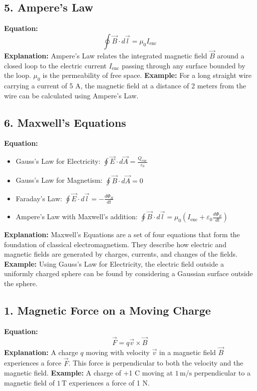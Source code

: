 \documentclass{article}
\begin{document}
\subsection*{5. Ampere's Law}
\textbf{Equation:} 
\[ \oint \vec{B} \cdot d\vec{l} = \mu_0 I_{\text{enc}} \]
\textbf{Explanation:} 
Ampere's Law relates the integrated magnetic field \( \vec{B} \) around a closed loop to the electric current \( I_{\text{enc}} \) passing through any surface bounded by the loop. \( \mu_0 \) is the permeability of free space.
\textbf{Example:}
For a long straight wire carrying a current of 5 A, the magnetic field at a distance of 2 meters from the wire can be calculated using Ampere's Law.

\subsection*{6. Maxwell's Equations}
\textbf{Equation:} 
\begin{itemize}
    \item Gauss's Law for Electricity: \( \oint \vec{E} \cdot d\vec{A} = \frac{Q_{\text{enc}}}{\varepsilon_0} \)
    \item Gauss's Law for Magnetism: \( \oint \vec{B} \cdot d\vec{A} = 0 \)
    \item Faraday's Law: \( \oint \vec{E} \cdot d\vec{l} = -\frac{d\Phi_B}{dt} \)
    \item Ampere's Law with Maxwell's addition: \( \oint \vec{B} \cdot d\vec{l} = \mu_0 (I_{\text{enc}} + \varepsilon_0 \frac{d\Phi_E}{dt}) \)
\end{itemize}
\textbf{Explanation:} 
Maxwell's Equations are a set of four equations that form the foundation of classical electromagnetism. They describe how electric and magnetic fields are generated by charges, currents, and changes of the fields.
\textbf{Example:} 
Using Gauss's Law for Electricity, the electric field outside a uniformly charged sphere can be found by considering a Gaussian surface outside the sphere.

\subsection*{1. Magnetic Force on a Moving Charge}
\textbf{Equation:} 
\[ \vec{F} = q\vec{v} \times \vec{B} \]
\textbf{Explanation:} 
A charge \( q \) moving with velocity \( \vec{v} \) in a magnetic field \( \vec{B} \) experiences a force \( \vec{F} \). This force is perpendicular to both the velocity and the magnetic field.
\textbf{Example:}
A charge of +1 C moving at \( 1 \, \text{m/s} \) perpendicular to a magnetic field of \( 1 \, \text{T} \) experiences a force of 1 N.
\end{document}
